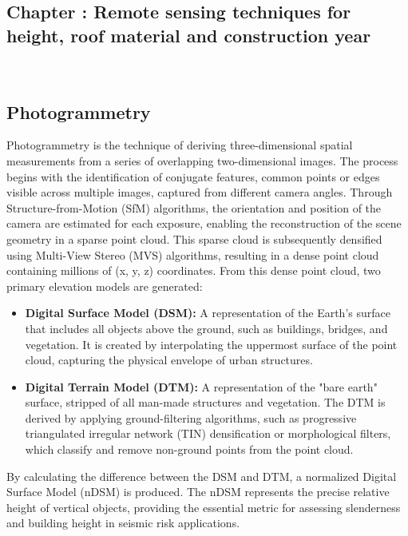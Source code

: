 \graphicspath{{figures_and_references/EELISA_conference/}}
\renewcommand{\chapternametext}{Chapter \thechapter: Remote sensing techniques for height, roof material and construction year}
\renewcommand{\shortchapternametext}{Chapter \thechapter: Remote sensing techniques}
\begin{refsection}
\chapter{\chapternametext}
\
\renewcommand{\headingtextL}{}
\renewcommand{\headingtextR}{\shortchapternametext}
\begingroup
\flushbottom
\setlength{\parskip}{0pt plus 1fil}%
\localtableofcontents
\endgroup

\newpage
\setcounter{section}{0}
\renewcommand{\sectionnametext}{Photogrammetry}
\renewcommand{\headingtextL}{\shortchapternametext}
\renewcommand{\headingtextR}{\thesection. \sectionnametext}
\section{\sectionnametext}
Photogrammetry is the technique of deriving three-dimensional spatial measurements from a series of overlapping two-dimensional images. The process begins with the identification of conjugate features, common points or edges visible across multiple images, captured from different camera angles. Through Structure-from-Motion (SfM) algorithms, the orientation and position of the camera are estimated for each exposure, enabling the reconstruction of the scene geometry in a sparse point cloud. This sparse cloud is subsequently densified using Multi-View Stereo (MVS) algorithms, resulting in a dense point cloud containing millions of (x, y, z) coordinates.
From this dense point cloud, two primary elevation models are generated:
\begin{itemize}
\item \textbf{Digital Surface Model (DSM):} A representation of the Earth's surface that includes all objects above the ground, such as buildings, bridges, and vegetation. It is created by interpolating the uppermost surface of the point cloud, capturing the physical envelope of urban structures.
\item \textbf{Digital Terrain Model (DTM):} A representation of the "bare earth" surface, stripped of all man-made structures and vegetation. The DTM is derived by applying ground-filtering algorithms, such as progressive triangulated irregular network (TIN) densification or morphological filters, which classify and remove non-ground points from the point cloud.
\end{itemize}
By calculating the difference between the DSM and DTM, a normalized Digital Surface Model (nDSM) is produced. The nDSM represents the precise relative height of vertical objects, providing the essential metric for assessing slenderness and building height in seismic risk applications.

\end{refsection}
